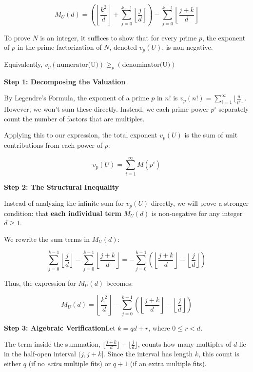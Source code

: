\begin{enumerate}
 
 \[M_U(d) = \left( \left\lfloor \frac{k^2}{d} \right\rfloor + \sum_{j=0}^{k-1} \left\lfloor \frac{j}{d} \right\rfloor \right) - \sum_{j=0}^{k-1} \left\lfloor \frac{j+k}{d} \right\rfloor\]

 
To prove $N$ is an integer, it suffices to show that for every prime $p$, the exponent of $p$ in the prime factorization of $N$, denoted $v_p(U)$, is non-negative.

 Equivalently, $v_p(\text{numerator(U)}) \ge _p(\text{denominator(U)})$

 \textbf{Step 1: Decomposing the Valuation}

 By Legendre's Formula, the exponent of a prime $p$ in $n!$ is $v_p(n!) = \sum_{i=1}^{\infty} \lfloor \frac{n}{p^i} \rfloor$. However, we won't sum these directly. Instead, we each prime power $p^i$ separately count the number of factors that are multiples.

 Applying this to our expression, the total exponent $v_p(U)$ is the sum of unit contributions from each power of $p$:

 
 \[v_p(U) = \sum_{i=1}^{\infty} M(p^i)\]

 \textbf{Step 2: The Structural Inequality}

 Instead of analyzing the infinite sum for $v_p(U)$ directly, we will prove a stronger condition: that \textbf{each individual term} $M_U(d)$ is non-negative for any integer $d \ge 1$.

 We rewrite the sum terms in $M_U(d)$:

 
 \[\sum_{j=0}^{k-1} \left\lfloor \frac{j}{d} \right\rfloor - \sum_{j=0}^{k-1} \left\lfloor \frac{j+k}{d} \right\rfloor  = - \sum_{j=0}^{k-1} \left( \left\lfloor \frac{j+k}{d} \right\rfloor - \left\lfloor \frac{j}{d} \right\rfloor \right)\]

 Thus, the expression for $M_U(d)$ becomes:

 
 \[M_U(d) = \left\lfloor \frac{k^2}{d} \right\rfloor - \sum_{j=0}^{k-1} \left( \left\lfloor \frac{j+k}{d} \right\rfloor - \left\lfloor \frac{j}{d} \right\rfloor \right)\]

 \textbf{Step 3: Algebraic Verification}Let $k = qd + r$, where $0 \le r < d$. 

 The term inside the summation, $\lfloor \frac{j+k}{d} \rfloor - \lfloor \frac{j}{d} \rfloor$, counts how many multiples of $d$ lie in the half-open interval $(j, j+k]$. Since the interval has length $k$, this count is either $q$ (if no \textit{extra} multiple fits) or $q+1$ (if an extra multiple fits).


\end{enumerate}
